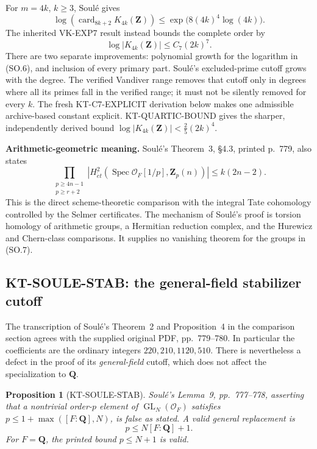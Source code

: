 \documentclass[11pt,a4paper]{article}
\newtheorem{proposition}[theorem]{Proposition}
\theoremstyle{definition}
\renewcommand{\paragraph}[1]{\par\smallskip\noindent\textbf{#1}\quad\ignorespaces}
\begin{document}
For $m=4k$, $k\geq3$, Soul\'e gives
\[
 \log\left(
   \operatorname{card}_{8k+2} K_{4k}(\mathbf Z)
 \right)
 \leq \exp\!\bigl(8(4k)^4\log(4k)\bigr).
 \tag{SO.5}
\]
The inherited VK-EXP7 result instead bounds the complete order
by
\[
       \log|K_{4k}(\mathbf Z)|\leq C_7(2k)^7.
 \tag{SO.6}
\]
There are two separate improvements: polynomial growth for
the logarithm in (SO.6), and inclusion of every primary part.
Soul\'e's excluded-prime cutoff grows with the degree.
The verified Vandiver range removes that cutoff only in
degrees where all its primes fall in the verified range;
it must not be silently removed for every $k$.
The fresh KT-C7-EXPLICIT derivation below makes one admissible
archive-based constant explicit. KT-QUARTIC-BOUND gives the
sharper, independently derived bound
$\log|K_{4k}(\mathbf Z)|<\frac25(2k)^4$.

\paragraph{Arithmetic-geometric meaning.}
Soul\'e's Theorem~3, \S4.3, printed p.~779, also states
\[
 \prod_{\substack{p\geq4n-1\\p\geq r+2}}
 \left|H^2_{\acute et}(\operatorname{Spec}\mathcal O_F[1/p],
                                      \mathbf Z_p(n))\right|
 \leq k(2n-2).
 \tag{SO.7}
\]
This is the direct scheme-theoretic comparison with the
integral Tate cohomology controlled by the Selmer certificates.
The mechanism of Soul\'e's proof is torsion homology of
arithmetic groups, a Hermitian reduction complex, and the
Hurewicz and Chern-class comparisons. It supplies no
vanishing theorem for the groups in (SO.7).



\subsection{KT-SOULE-STAB: the general-field stabilizer cutoff}
\label{sec:kt-soule-stab}

The transcription of Soul\'e's Theorem~2 and Proposition~4
in the comparison section agrees with the supplied original
PDF, pp.~779--780. In particular the coefficients are the
ordinary integers $220,210,1120,510$. There is nevertheless
a defect in the proof of its \emph{general-field} cutoff,
which does not affect the specialization to $\mathbf Q$.

\begin{proposition}[KT-SOULE-STAB]
Soul\'e's Lemma~9, pp.~777--778, asserting that a nontrivial
order-$p$ element of $\operatorname{GL}_N(\mathcal O_F)$
satisfies $p\leq1+\max([F:\mathbf Q],N)$, is false as
stated. A valid general replacement is
\[
                         p\leq N[F:\mathbf Q]+1.
                                                               \tag{SS.1}
\]
For $F=\mathbf Q$, the printed bound $p\leq N+1$ is valid.
\end{proposition}
\end{document}
